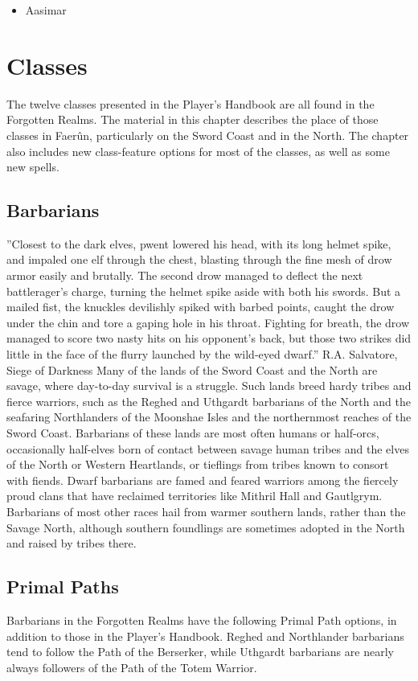 \documentclass[10pt,a4paper,twoside,twocolumn,openany,bg=print,nodeprecatedcode]{dndbook}
\begin{document}
\begin{itemize}
\item Aasimar
\end{itemize}

\chapter{Classes}
The twelve classes presented in the Player's Handbook are all found in the Forgotten Realms. The material in this chapter describes the place of those classes in Faerûn, particularly on the Sword Coast and in the North. The chapter also includes new class-feature options for most of the classes, as well as some new spells.
\section{Barbarians}
\DndQuote%
{}
{''Closest to the dark elves, pwent lowered his head, with its long helmet spike, and impaled one elf through the chest, blasting through the fine mesh of drow armor easily and brutally. The second drow managed to deflect the next battlerager's charge, turning the helmet spike aside with both his swords. But a mailed fist, the knuckles devilishly spiked with barbed points, caught the drow under the chin and tore a gaping hole in his throat. Fighting for breath, the drow managed to score two nasty hits on his opponent's back, but those two strikes did little in the face of the flurry launched by the wild-eyed dwarf.''}
{R.A. Salvatore, Siege of Darkness}
Many of the lands of the Sword Coast and the North are savage, where day-to-day survival is a struggle. Such lands breed hardy tribes and fierce warriors, such as the Reghed and Uthgardt barbarians of the North and the seafaring Northlanders of the Moonshae Isles and the northernmost reaches of the Sword Coast.
Barbarians of these lands are most often humans or half-orcs, occasionally half-elves born of contact between savage human tribes and the elves of the North or Western Heartlands, or tieflings from tribes known to consort with fiends. Dwarf barbarians are famed and feared warriors among the fiercely proud clans that have reclaimed territories like Mithril Hall and Gautlgrym. Barbarians of most other races hail from warmer southern lands, rather than the Savage North, although southern foundlings are sometimes adopted in the North and raised by tribes there.
\section{Primal Paths}
Barbarians in the Forgotten Realms have the following Primal Path options, in addition to those in the Player's Handbook. Reghed and Northlander barbarians tend to follow the Path of the Berserker, while Uthgardt barbarians are nearly always followers of the Path of the Totem Warrior.
\end{document}
